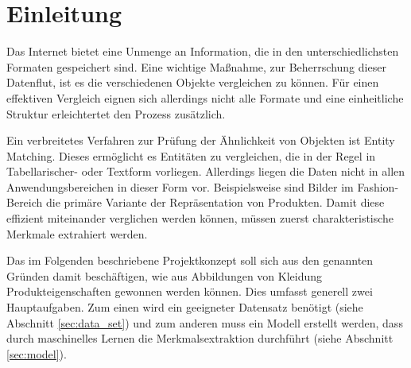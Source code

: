\section{Einleitung} \label{sec:intro}

Das Internet bietet eine Unmenge an Information, die in den unterschiedlichsten Formaten gespeichert sind. Eine wichtige Maßnahme, zur Beherrschung dieser Datenflut, ist es die verschiedenen Objekte vergleichen zu können. Für einen effektiven Vergleich eignen sich allerdings nicht alle Formate und eine einheitliche Struktur erleichtertet den Prozess zusätzlich.

Ein verbreitetes Verfahren zur Prüfung der Ähnlichkeit von Objekten ist Entity Matching. Dieses ermöglicht es Entitäten zu vergleichen, die in der Regel in Tabellarischer- oder Textform vorliegen. Allerdings liegen die Daten nicht in allen Anwendungsbereichen in dieser Form vor. Beispielsweise sind Bilder im Fashion-Bereich die primäre Variante der Repräsentation von Produkten. Damit diese effizient miteinander verglichen werden können, müssen zuerst charakteristische Merkmale extrahiert werden.

Das im Folgenden beschriebene Projektkonzept soll sich aus den genannten Gründen damit beschäftigen, wie aus Abbildungen von Kleidung Produkteigenschaften gewonnen werden können. Dies umfasst generell zwei Hauptaufgaben. Zum einen wird ein geeigneter Datensatz benötigt (siehe Abschnitt \ref{sec:data_set}) und zum anderen muss ein Modell erstellt werden, dass durch maschinelles Lernen die Merkmalsextraktion durchführt (siehe Abschnitt \ref{sec:model}).